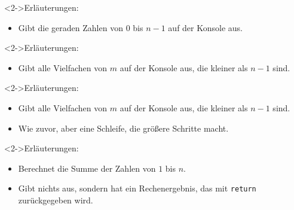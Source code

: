 \begin{fframe}
    \begin{block}<2->{Erläuterungen:}
        \begin{itemize}
            \item Gibt die geraden Zahlen von $0$ bis $n-1$ auf der Konsole aus.
        \end{itemize}
    \end{block}
\end{fframe}

\begin{fframe}
    \begin{block}<2->{Erläuterungen:}
        \begin{itemize}
            \item Gibt alle Vielfachen von $m$ auf der Konsole aus, die kleiner als $n-1$ sind.
        \end{itemize}
    \end{block}
\end{fframe}

\begin{fframe}
    \begin{block}<2->{Erläuterungen:}
        \begin{itemize}
            \item Gibt alle Vielfachen von $m$ auf der Konsole aus, die kleiner als $n-1$ sind.
            \item Wie zuvor, aber eine Schleife, die größere Schritte macht.
        \end{itemize}
    \end{block}
\end{fframe}

\begin{fframe}
    \begin{block}<2->{Erläuterungen:}
        \begin{itemize}
            \item Berechnet die Summe der Zahlen von $1$ bis $n$.
            \item Gibt nichts aus, sondern hat ein Rechenergebnis, das mit \texttt{return} zurückgegeben wird.
        \end{itemize}
    \end{block}
\end{fframe}

